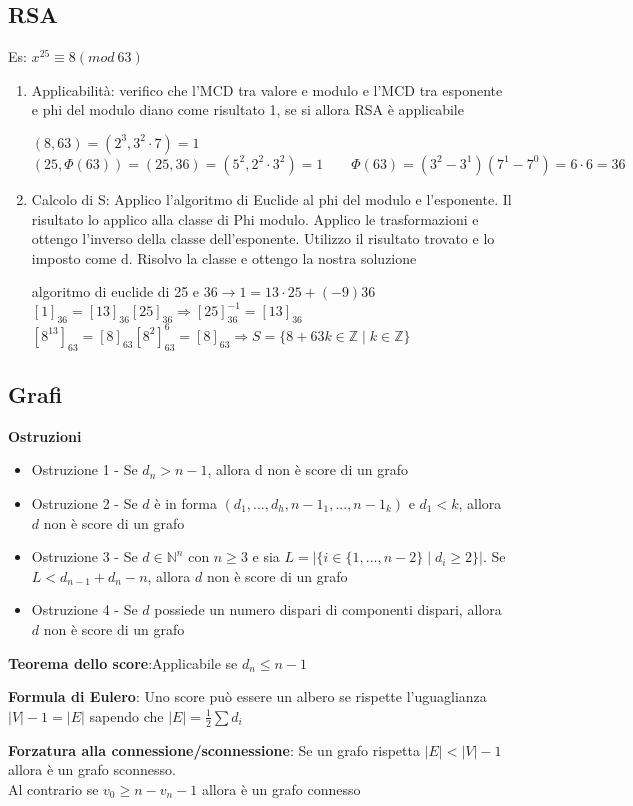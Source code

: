 \documentclass[11pt, letterpaper]{article}
\begin{document}
\subsection{RSA}
Es: $x^{25}\equiv 8(mod\ 63)$
\begin{enumerate}
    \item Applicabilità: verifico che l'MCD tra valore e modulo e l'MCD tra esponente e phi del modulo 
    diano come risultato 1, se si allora RSA è applicabile
    \begin{center}
        $(8,63)=(2^{3},3^{2}\cdot 7)=1$\\
        $(25,\Phi(63))=(25,36)=(5^{2},2^{2}\cdot 3^{2})=1\qquad \Phi(63)=(3^{2}-3^{1})(7^{1}-7^{0})
        =6\cdot 6=36$
    \end{center}
    \item Calcolo di S: Applico l'algoritmo di Euclide al phi del modulo e l'esponente. Il risultato lo applico
    alla classe di Phi modulo. Applico le trasformazioni e ottengo l'inverso della classe dell'esponente.
    Utilizzo il risultato trovato e lo imposto come d. Risolvo la classe e ottengo la nostra soluzione
    \begin{center}
        algoritmo di euclide di 25 e 36$\rightarrow 1=13\cdot25+(-9)36$\\
        $[1]_{36}=[13]_{36}[25]_{36}\Rightarrow [25]^{-1}_{36}=[13]_{36}$\\
        $[8^{13}]_{63}=[8]_{63}[8^{2}]^{6}_{63}=[8]_{63}\Rightarrow S=\{8+63k\in\mathbb{Z}\mid 
        k\in\mathbb{Z}\}$
    \end{center}
\end{enumerate}
\subsection{Grafi}
\textbf{Ostruzioni}
\begin{itemize}
    \item Ostruzione 1 - Se $d_{n} > n-1$, allora d non è score di un grafo
    \item Ostruzione 2 - Se $d$ è in forma $(d_{1},...,d_{h},n-1_{1},...,n-1_{k})$ e $d_{1}<k$, allora 
    $d$ non è score di un grafo
    \item Ostruzione 3 - Se $d\in\mathbb{N}^{n}$ con $n\geq 3$ e sia $L=|\{i\in\{1,...,n-2\}\mid
    d_{i}\geq 2\}|$. Se $L<d_{n-1}+d_{n}-n$, allora $d$ non è score di un grafo
    \item Ostruzione 4 - Se $d$ possiede un numero dispari di componenti dispari, allora $d$ non è score
    di un grafo
\end{itemize}
\textbf{Teorema dello score}:Applicabile se $d_{n}\leq n-1$

\textbf{Formula di Eulero}: Uno score può essere un albero se rispette l'uguaglianza $|V|-1=|E|$ sapendo
che $|E|=\frac{1}{2}\sum d_{i}$

\textbf{Forzatura alla connessione/sconnessione}: Se un grafo rispetta $|E|<|V|-1$ allora è un grafo 
sconnesso.\\Al contrario se $v_{0}\geq n - v_{n} -1$ allora è un grafo connesso
\end{document}
